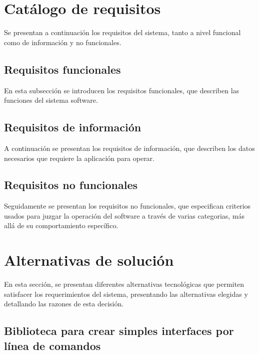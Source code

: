 
\section{Catálogo de requisitos}

Se presentan a continuación los requisitos del sistema, tanto a nivel funcional
como de información y no funcionales.

\subsection{Requisitos funcionales}

En esta subsección se introducen los requisitos funcionales, que describen las funciones
del sistema software.

\subsection{Requisitos de información}

A continuación se presentan los requisitos de información, que describen los datos
necesarios que requiere la aplicación para operar.

\subsection{Requisitos no funcionales}

Seguidamente se presentan los requisitos no funcionales, que especifican criterios
usados para juzgar la operación del software a través de varias categorias, más
allá de su comportamiento específico.


\section{Alternativas de solución}

En esta sección, se presentan diferentes alternativas tecnológicas que permiten
satisfacer los requerimientos del sistema, presentando las alternativas elegidas y
detallando las razones de esta decisión.

\subsection{Biblioteca para crear simples interfaces por línea de comandos}

